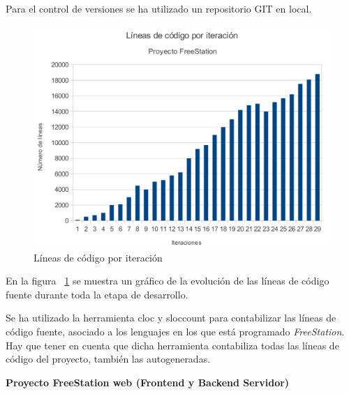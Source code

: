 Para el control de versiones se ha utilizado un repositorio GIT en local. 

\begin{figure}[ht]
    \begin{center}
        \includegraphics[width=425px]{src/img/diagrams/code-iteration.pdf}
        \caption[Líneas de código por iteración]
          {Líneas de código por iteración}
          \label{fig:codeiteration}
    \end{center}
\end{figure}

En la figura ~\ref{fig:codeiteration} se muestra un gráfico de la evolución de
las líneas de código fuente durante toda la etapa de desarrollo.

Se ha utilizado la herramienta cloc y sloccount para contabilizar las líneas de 
código fuente, asociado a los lenguajes en los que está programado
\emph{FreeStation}. Hay que tener en cuenta que dicha herramienta contabiliza
todas las líneas de código del proyecto, también las autogeneradas. 

\newpage

\textbf{Proyecto FreeStation web (Frontend y Backend Servidor)}

